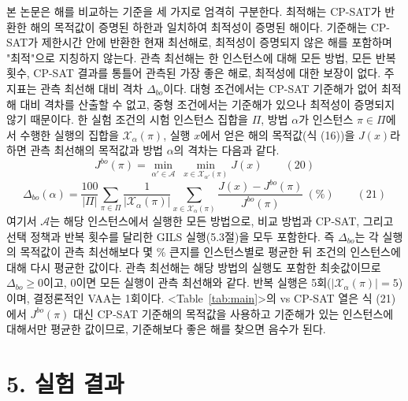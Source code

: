 \documentclass[10pt,a4paper]{article}
\begin{document}
본 논문은 해를 비교하는 기준을 세 가지로 엄격히 구분한다. 최적해는 CP-SAT가
반환한 해의 목적값이 증명된 하한과 일치하여 최적성이 증명된 해이다. 기준해는
CP-SAT가 제한시간 안에 반환한 현재 최선해로, 최적성이 증명되지 않은 해를 포함하며 "최적"으로 지칭하지 않는다.
관측 최선해는 한 인스턴스에 대해 모든 방법, 모든 반복 횟수, CP-SAT 결과를
통틀어 관측된 가장 좋은 해로, 최적성에 대한 보장이 없다. %
주 지표는 관측 최선해 대비 격차 $\Delta_{bo}$이다. %
대형 조건에서는
CP-SAT 기준해가 없어 최적해 대비 격차를 산출할 수 없고, 중형 조건에서는 기준해가 있으나 최적성이 증명되지 않기 때문이다.
한 실험 조건의 시험 인스턴스 집합을 $\varPi$, 방법 $\alpha$가 인스턴스 $\pi\in\varPi$에서 수행한 실행의 집합을
$\mathcal{X}_\alpha(\pi)$, 실행 $x$에서 얻은 해의 목적값(식 (16))을 $J(x)$라 하면 관측 최선해의 목적값과
방법 $\alpha$의 격차는 다음과 같다.
\[J^{bo}(\pi)=\min_{\alpha'\in\mathcal{A}}\ \min_{x\in\mathcal{X}_{\alpha'}(\pi)}J(x) \qquad (20)\]
\[\Delta_{bo}(\alpha)=\frac{100}{|\varPi|}\sum_{\pi\in\varPi}\frac{1}{|\mathcal{X}_\alpha(\pi)|}\sum_{x\in\mathcal{X}_\alpha(\pi)}\frac{J(x)-J^{bo}(\pi)}{J^{bo}(\pi)}\ (\%) \qquad (21)\]
여기서 $\mathcal{A}$는 해당 인스턴스에서 실행한 모든 방법으로, 비교 방법과 CP-SAT, 그리고 선택 정책과 반복 횟수를
달리한 GILS 실행(5.3절)을 모두 포함한다. 즉 $\Delta_{bo}$는 각 실행의 목적값이 관측 최선해보다 몇 \% 큰지를
인스턴스별로 평균한 뒤 조건의 인스턴스에 대해 다시 평균한 값이다. 관측 최선해는 해당 방법의 실행도 포함한
최솟값이므로 $\Delta_{bo}\ge0$이고, 0이면 모든 실행이 관측 최선해와 같다. 반복 실행은 5회($|\mathcal{X}_\alpha(\pi)|=5$)이며,
결정론적인 VAA는 1회이다. <Table~\ref{tab:main}>의 vs CP-SAT 열은 식 (21)에서 $J^{bo}(\pi)$ 대신 CP-SAT 기준해의 목적값을 사용하고 기준해가 있는 인스턴스에 대해서만 평균한 값이므로, 기준해보다 좋은 해를 찾으면 음수가 된다.



\section{5. 실험 결과}
\end{document}
